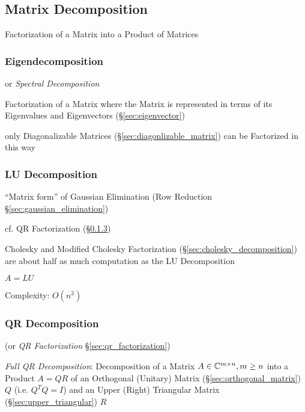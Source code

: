 \subsection{Matrix Decomposition}\label{sec:matrix_decomposition}

Factorization of a Matrix into a Product of Matrices



\subsubsection{Eigendecomposition}\label{sec:eigendecomposition}

or \emph{Spectral Decomposition}

Factorization of a Matrix where the Matrix is represented in terms of its
Eigenvalues and Eigenvectors (\S\ref{sec:eigenvector})

only Diagonalizable Matrices (\S\ref{sec:diagonlizable_matrix}) can be
Factorized in this way



\subsubsection{LU Decomposition}\label{sec:lu_decomposition}

``Matrix form'' of Gaussian Elimination (Row Reduction
\S\ref{sec:gaussian_elimination})

cf. QR Factorization (\S\ref{sec:qr_decomposition})

Cholesky and Modified Cholesky Factorization
(\S\ref{sec:cholesky_decomposition}) are about half as much computation as the
LU Decomposition

$A = LU$

Complexity: $O(n^3)$



\subsubsection{QR Decomposition}\label{sec:qr_decomposition}

(or \emph{QR Factorization} \S\ref{sec:qr_factorization})

\emph{Full QR Decomposition}: Decomposition of a Matrix $A \in \mathbb{C}^{m \times
  n}, m \geq n$ into a Product $A = QR$ of an Orthogonal (Unitary) Matrix
(\S\ref{sec:orthogonal_matrix}) $Q$ (i.e. $Q^TQ = I$) and an Upper (Right)
Triangular Matrix (\S\ref{sec:upper_triangular}) $R$

